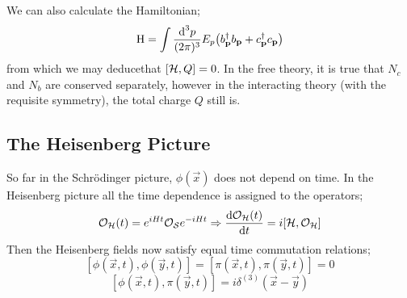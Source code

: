 We can also calculate the Hamiltonian;
\begin{equation}
\text{H} = \int{\frac{\ud^3 p}{(2\pi)^3} E_p \left(b\dagg_{\vec p} b_{\vec p} + c_{\vec p}\dagg c_{\vec p}\right)}
\end{equation}
from which we may deduce\footnotemark that $\left[\hamilt, Q\right] = 0$. In the free theory, it is true that $N_{c}$ and $N_{b}$ are conserved separately, however in the interacting theory (with the requisite symmetry), the total charge $Q$ still is.
\subsection{The Heisenberg Picture}
So far in the Schr{\"o}dinger picture, $\phi(\vec x)$ does not depend on time. In the Heisenberg picture all the time dependence is assigned to the operators;
\begin{equation}
\mO_{\hamilt}(t) = e^{iHt} \mO_{\mathcal{S}} e^{-iHt} \Rightarrow \frac{\ud \mO_{\hamilt}(t)}{\ud t} = i\left[\hamilt, \mO_{\hamilt}\right]
\end{equation}
Then the Heisenberg fields now satisfy equal time commutation relations;
\begin{equation}
\left[\phi(\vec x, t), \phi(\vec y, t)\right] = \left[\pi(\vec x, t), \pi(\vec y, t)\right] = 0
\end{equation}
\begin{equation}
\left[\phi(\vec x, t), \pi(\vec y, t)\right] = i\delta^{(3)}(\vec x - \vec y)
\end{equation}










